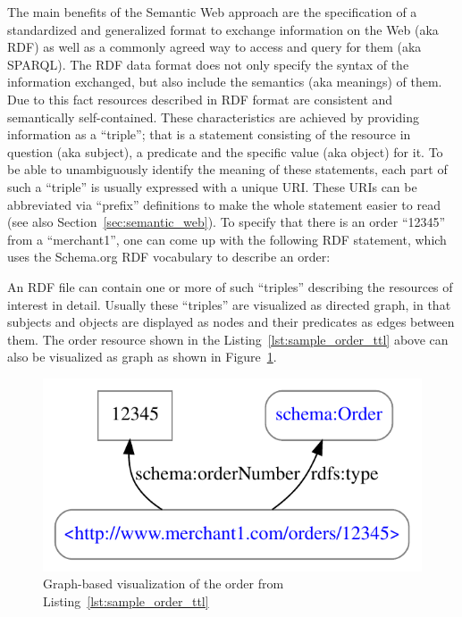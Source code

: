 The main benefits of the Semantic Web approach are the specification of a standardized and generalized format to exchange information on the Web (aka \gls{RDF}) as well as a commonly agreed way to access and query for them (aka \gls{SPARQL}). The \gls{RDF} data format does not only specify the syntax of the information exchanged, but also include the semantics (aka meanings) of them. Due to this fact resources described in \gls{RDF} format are consistent and semantically self-contained. These characteristics are achieved by providing information as a ``triple''; that is a statement consisting of the resource in question (aka subject), a predicate and the specific value (aka object) for it. To be able to unambiguously identify the meaning of these statements, each part of such a ``triple'' is usually expressed with a unique \gls{URI}. These \gls{URI}s can be abbreviated via ``prefix'' definitions to make the whole statement easier to read (see also Section~\ref{sec:semantic_web}). To specify that there is an order ``12345'' from a ``merchant1'', one can come up with the following \gls{RDF} statement, which uses the Schema.org \gls{RDF} vocabulary \citep{Schema.org} to describe an order: \@


An \gls{RDF} file can contain one or more of such ``triples'' describing the resources of interest in detail. Usually these ``triples'' are visualized as directed graph, in that subjects and objects are displayed as nodes and their predicates as edges between them. The order resource shown in the Listing~\ref{lst:sample_order_ttl} above can also be visualized as graph as shown in Figure~\ref{fig:sample_order_graph_image}. \@

\begin{figure}[H]
  \centering
  \includegraphics[width=0.8\columnwidth]{images/sample_order_12345.pdf}
  \caption{Graph-based visualization of the order from Listing~\ref{lst:sample_order_ttl}}
\label{fig:sample_order_graph_image}
\end{figure}

